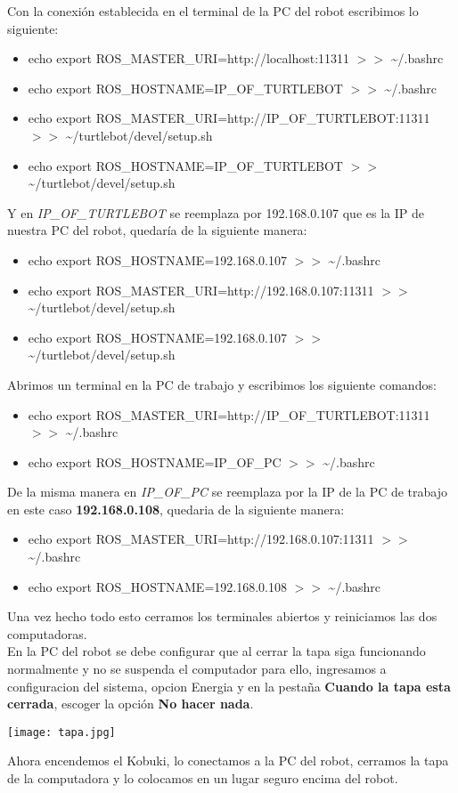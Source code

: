 \documentclass[12pt,a4paper]{article}
\begin{document}
\begin{itemize}
Con la conexión establecida en el terminal de la PC del robot escribimos lo siguiente:
\begin{itemize}
\item echo export ROS\_MASTER\_URI=http://localhost:11311 $>>$ \textasciitilde/.bashrc
\item echo export ROS\_HOSTNAME=IP\_OF\_TURTLEBOT $>>$ \textasciitilde/.bashrc
\item echo export ROS\_MASTER\_URI=http://IP\_OF\_TURTLEBOT:11311 $>>$ \textasciitilde/turtlebot/devel/setup.sh
\item echo export ROS\_HOSTNAME=IP\_OF\_TURTLEBOT $>>$ \textasciitilde/turtlebot/devel/setup.sh
\end{itemize}
Y en \textit{IP\_OF\_TURTLEBOT} se reemplaza  por 192.168.0.107 que es la IP de nuestra PC del robot, quedaría de la siguiente manera:
\begin{itemize}
\item echo export ROS\_HOSTNAME=192.168.0.107 $>>$ \textasciitilde/.bashrc
\item echo export ROS\_MASTER\_URI=http://192.168.0.107:11311 $>>$ \textasciitilde/turtlebot/devel/setup.sh
\item echo export ROS\_HOSTNAME=192.168.0.107 $>>$ \textasciitilde/turtlebot/devel/setup.sh
\end{itemize}
Abrimos un terminal en la PC de trabajo y escribimos los siguiente comandos:
\begin{itemize}
\item echo export ROS\_MASTER\_URI=http://IP\_OF\_TURTLEBOT:11311 $>>$ \textasciitilde/.bashrc
\item echo export ROS\_HOSTNAME=IP\_OF\_PC $>>$ \textasciitilde/.bashrc
\end{itemize}
De la misma manera en \textit{IP\_OF\_PC} se reemplaza por la IP de la PC  de trabajo en este caso \textbf{192.168.0.108}, quedaria de la siguiente manera:
\begin{itemize}
\item echo export ROS\_MASTER\_URI=http://192.168.0.107:11311 $>>$ \textasciitilde/.bashrc
\item echo export ROS\_HOSTNAME=192.168.0.108 $>>$ \textasciitilde/.bashrc
\end{itemize}
Una vez hecho todo esto cerramos los terminales abiertos y reiniciamos las dos computadoras.\\
En la PC del robot se debe configurar que al cerrar la tapa siga funcionando normalmente y no se suspenda el computador para ello, ingresamos a configuracion del sistema, opcion Energia y en la pestaña \textbf{Cuando la tapa esta cerrada}, escoger la opción \textbf{No hacer nada}.
\begin{center}
\texttt{[image: tapa.jpg]}
\end{center}
Ahora encendemos el Kobuki, lo conectamos a la PC del robot, cerramos la tapa de la computadora y lo colocamos en un lugar seguro encima del robot.


\end{itemize}
\end{document}
